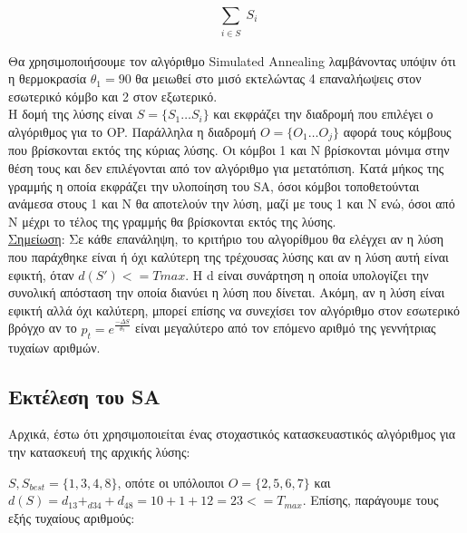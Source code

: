 \documentclass[12pt, a4paper]{article}
\begin{document}
\begin{equation}
 \sum_{\substack{
		 i \in S}}
	S_i
\end{equation}

Θα χρησιμοποιήσουμε τον αλγόριθμο Simulated Annealing λαμβάνοντας υπόψιν ότι η θερμοκρασία \(\theta_1 = 90 \) θα μειωθεί στο μισό εκτελώντας 4 επαναλήωψεις στον εσωτερικό κόμβο και 2 στον εξωτερικό. \\

Η δομή της λύσης είναι \( S = \{S_1…S_i\}\) και εκφράζει την διαδρομή που επιλέγει ο αλγόριθμος για το OP. Παράλληλα η διαδρομή \(O = \{O_1…O_j\}\) αφορά τους κόμβους που βρίσκονται εκτός της κύριας λύσης.   Οι κόμβοι 1 και Ν βρίσκονται μόνιμα στην θέση τους και δεν επιλέγονται από τον αλγόριθμο για μετατόπιση. Κατά μήκος της γραμμής η οποία εκφράζει την υλοποίηση του SA, όσοι κόμβοι τοποθετούνται ανάμεσα στους 1 και Ν θα αποτελούν την λύση, μαζί με τους 1 και Ν ενώ, όσοι από Ν μέχρι το τέλος της γραμμής θα βρίσκονται εκτός της λύσης. \\

\underline{Σημείωση}: Σε κάθε επανάληψη, το κριτήριο του αλγορίθμου θα ελέγχει αν η λύση που παράχθηκε είναι ή όχι καλύτερη της τρέχουσας λύσης και αν η λύση αυτή είναι εφικτή, όταν \(d(S') <= Tmax\). Η d είναι συνάρτηση η οποία υπολογίζει την συνολική απόσταση την οποία διανύει η λύση που δίνεται. Ακόμη, αν η λύση είναι εφικτή αλλά όχι καλύτερη, μπορεί επίσης να συνεχίσει τον αλγόριθμο στον εσωτερικό βρόγχο αν το \(p_t = e^{\frac{-\Delta S}{\theta_t}}\) είναι μεγαλύτερο από τον επόμενο αριθμό της γεννήτριας τυχαίων αριθμών.

\subsection{Εκτέλεση του SA}

Αρχικά, έστω ότι χρησιμοποιείται ένας στοχαστικός κατασκευαστικός αλγόριθμος για την κατασκευή της αρχικής λύσης:

\(S, S_{best}=\{1,3,4,8\}\), οπότε οι υπόλοιποι \(O=\{2,5,6,7\}\) και
\(d(S) = d_{13}+_{d34}+d_{48} = 10 + 1 + 12 = 23 <= T_{max}\). 
Επίσης, παράγουμε τους εξής τυχαίους αριθμούς:
\end{document}
